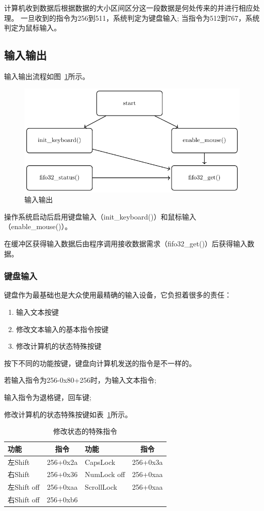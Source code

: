 计算机收到数据后根据数据的大小区间区分这一段数据是何处传来的并进行相应处理。
一旦收到的指令为256到511，系统判定为键盘输入;
当指令为512到767，系统判定为鼠标输入。


\subsection{输入输出}

输入输出流程如图~\ref{fig:io}所示。
\begin{figure}[H]
  \centering
  \includegraphics[width=.5\textwidth]{fig/func/io.pdf}
  \caption{输入输出}
  \label{fig:io}
\end{figure}
操作系统启动后启用键盘输入（init\_keyboard()）和鼠标输入（enable_mouse()）。

在缓冲区获得输入数据后由程序调用接收数据需求（fifo32_get()）后获得输入数据。

\subsubsection{键盘输入}

键盘作为最基础也是大众使用最精确的输入设备，它负担着很多的责任：
\begin{enumerate}
\item 输入文本按键
\item 修改文本输入的基本指令按键
\item 修改计算机的状态特殊按键
\end{enumerate}

按下不同的功能按键，键盘向计算机发送的指令是不一样的。

若输入指令为256-0x80+256时，为输入文本指令;

输入指令为退格键，回车键;

修改计算机的状态特殊按键如表~\ref{tab:spccmd}所示。
\begin{table}[!ht]
  \centering
  \begin{tabular}{lc|lc}
    \hline 功能 & 指令 & 功能 & 指令 \\
    \hline 左Shift & 256+0x2a & CapsLock & 256+0x3a \\ 
     右Shift & 256+0x36 & NumLock off & 256+0xaa \\
     左Shift off & 256+0xaa & ScrollLock & 256+0xaa \\
     右Shift off & 256+0xb6 & & \\
    \hline
  \end{tabular}
  \caption{修改状态的特殊指令}
  \label{tab:spccmd}
\end{table}


